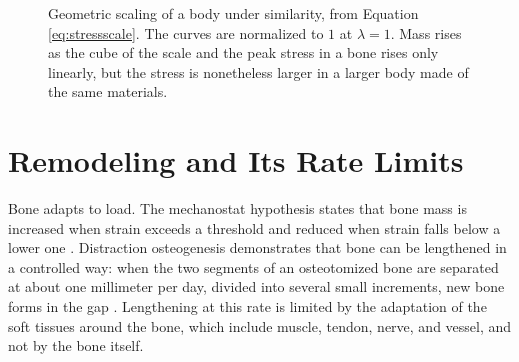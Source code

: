 \documentclass[11pt,openany]{book}
\theoremstyle{definition}
\theoremstyle{remark}
\begin{document}
\begin{figure}[ht]
\centering
{}
\caption{Geometric scaling of a body under similarity, from Equation \eqref{eq:stressscale}. The curves are normalized to $1$ at $\lambda=1$. Mass rises as the cube of the scale and the peak stress in a bone rises only linearly, but the stress is nonetheless larger in a larger body made of the same materials.}
\label{fig:scaling}
\end{figure}

\section{Remodeling and Its Rate Limits}

Bone adapts to load. The mechanostat hypothesis states that bone mass is increased when strain exceeds a threshold and reduced when strain falls below a lower one \cite{frost1987}. Distraction osteogenesis demonstrates that bone can be lengthened in a controlled way: when the two segments of an osteotomized bone are separated at about one millimeter per day, divided into several small increments, new bone forms in the gap \cite{ilizarov1989}. Lengthening at this rate is limited by the adaptation of the soft tissues around the bone, which include muscle, tendon, nerve, and vessel, and not by the bone itself.
\end{document}
